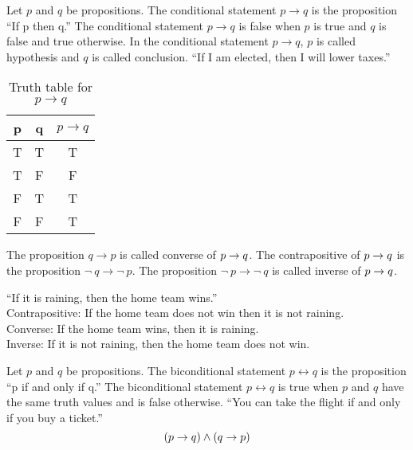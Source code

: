 \documentclass[../main-sheet.tex]{subfiles}
\begin{document}
Let \(p\) and \(q\) be propositions. The conditional statement \(p \to q\) is the proposition ``If p then q.'' The conditional statement \(p\to q\) is false when \(p\) is true and \(q\) is false and true otherwise. In the conditional statement \(p\to q\), \(p\) is called hypothesis and \(q\) is called conclusion.
``If I am elected, then I will lower taxes.''
\begin{table}[H]
    \centering
    \begin{tabular}{ccc}
        \toprule
        p & q & \(p\to q\) \\ \midrule
        T & T & T          \\ 
        T & F & F          \\ 
        F & T & T          \\ 
        F & F & T          \\ \bottomrule
    \end{tabular}
    \caption{Truth table for \(p\to q\)}
\end{table}
\begin{defn}
    The proposition \(q\to p\) is called converse of \(p \to q\).
    The contrapositive of \(p \to q\) is the proposition \(\neg\ q \to \neg\ p\).
    The proposition \(\neg\ p \to \neg\ q\) is called inverse of \(p \to q\).
\end{defn}
\begin{ex}
    ``If it is raining, then the home team wins.''\\
    Contrapositive: If the home team does not win then it is not raining.\\
    Converse: If the home team wins, then it is raining.\\
    Inverse: If it is not raining, then the home  team does not win.
\end{ex}
\begin{defn}[Biconditional]
    Let $ p $ and $ q $ be propositions. The biconditional statement \(p\leftrightarrow q\) is the proposition ``p if and only if q.'' The biconditional statement \(p\leftrightarrow q\) is true when $ p $ and $ q $ have the same truth values and is false otherwise.
    ``You can take the flight if and only if you buy a ticket.''
    \[(p \to q)\wedge(q\to p)\]
\end{defn}
\end{document}
